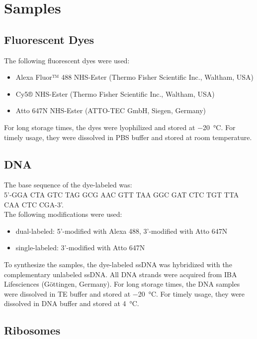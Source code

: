 \section{Samples}

\subsection{Fluorescent Dyes}

The following fluorescent dyes were used:
\begin{itemize}
	\item Alexa Fluor™ 488 NHS-Ester (Thermo Fisher Scientific Inc., Waltham, USA)
	\item Cy5® NHS-Ester (Thermo Fisher Scientific Inc., Waltham, USA)
	\item Atto 647N NHS-Ester (ATTO-TEC GmbH, Siegen, Germany)
\end{itemize}
For long storage times, the dyes were lyophilized and stored at \SI{-20}{\celsius}. For timely usage, they were dissolved in PBS buffer and stored at room temperature. 

\subsection{DNA}

The base sequence of the dye-labeled  was:\\
5’-GGA CTA GTC TAG GCG AAC GTT TAA GGC GAT CTC TGT TTA CAA CTC CGA-3’.\\
The following modifications were used:
\begin{itemize}
	\item dual-labeled: 5'-modified with Alexa 488, 3'-modified with Atto 647N
	\item single-labeled: 3'-modified with Atto 647N
\end{itemize}

To synthesize the  samples, the dye-labeled \gls{ssDNA} was hybrid\-ized with the complementary unlabeled \gls{ssDNA}. All DNA strands were acquired from IBA Lifesciences (Göttingen, Germany). For long storage times, the DNA samples were dissolved in TE buffer and stored at \SI{-20}{\celsius}. For timely usage, they were dissolved in DNA buffer and stored at \SI{4}{\celsius}. 

\subsection{Ribosomes}

